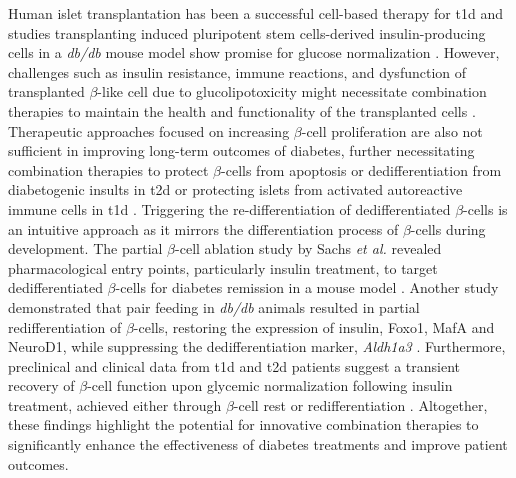 \par Human islet transplantation has been a successful cell-based therapy for \gls{t1d} \textbf{\cite{cefalu_heterogeneity_2021}} and studies transplanting induced pluripotent stem cells-derived insulin-producing cells in a \textit{db/db} mouse model show promise for glucose normalization \textbf{\cite{alipio_reversal_2010}}. However, challenges such as insulin resistance, immune reactions, and  dysfunction of transplanted $\beta$-like cell due to glucolipotoxicity might necessitate combination therapies to maintain the health and functionality of the transplanted cells \textbf{\cite{salib_stem_2022}}. Therapeutic approaches focused on increasing $\beta$-cell proliferation are also not sufficient in improving long-term outcomes of diabetes, further necessitating combination therapies to protect $\beta$-cells from apoptosis or dedifferentiation from diabetogenic insults in \gls{t2d} or protecting islets from activated autoreactive immune cells in \gls{t1d} \textbf{\cite{eguchi_dysregulation_2022}}. Triggering the re-differentiation of dedifferentiated $\beta$-cells is an intuitive approach as it mirrors the differentiation process of $\beta$-cells during development. The partial $\beta$-cell ablation study by Sachs \textit{et al.} revealed pharmacological entry points, particularly insulin treatment, to target dedifferentiated $\beta$-cells for diabetes remission in a mouse model \textbf{\cite{sachs_targeted_2020}}. Another study demonstrated that pair feeding in \textit{db/db} animals resulted in partial redifferentiation of $\beta$-cells, restoring the expression of insulin, Foxo1, MafA and NeuroD1, while suppressing the dedifferentiation marker, \textit{Aldh1a3} \textbf{\cite{ishida_pair_2017}}. Furthermore, preclinical and clinical data from \gls{t1d} and \gls{t2d} patients suggest a transient recovery of $\beta$-cell function upon glycemic normalization following insulin treatment, achieved either through $\beta$-cell rest or redifferentiation \textbf{\cite{harrison_-cell_2012,wang_pancreatic_2014}}. Altogether, these findings highlight the potential for innovative combination therapies to significantly enhance the effectiveness of diabetes treatments and improve patient outcomes.\\

